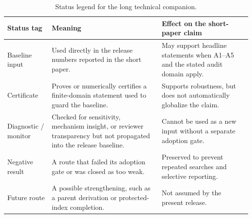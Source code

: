 \documentclass[aps,prd,onecolumn,notitlepage,nofootinbib,superscriptaddress,11pt,floatfix]{revtex4-2}
\begin{document}
\begin{table}[htbp]
\centering
\caption{Status legend for the long technical companion.}
\label{tab:supplement_status_legend}
\small
\setlength{\tabcolsep}{4pt}
\renewcommand{\arraystretch}{1.12}
\begin{tabular}{@{}l l l@{}}
\toprule
\parbox[t]{0.21\textwidth}{\textbf{Status tag}} & \parbox[t]{0.34\textwidth}{\textbf{Meaning}} & \parbox[t]{0.33\textwidth}{\textbf{Effect on the short-paper claim}} \\
\midrule
\parbox[t]{0.21\textwidth}{Baseline input} &
\parbox[t]{0.34\textwidth}{Used directly in the release numbers reported in the short paper.} &
\parbox[t]{0.33\textwidth}{May support headline statements when A1--A5 and the stated audit domain apply.} \\
\parbox[t]{0.21\textwidth}{Certificate} &
\parbox[t]{0.34\textwidth}{Proves or numerically certifies a finite-domain statement used to guard the baseline.} &
\parbox[t]{0.33\textwidth}{Supports robustness, but does not automatically globalize the claim.} \\
\parbox[t]{0.21\textwidth}{Diagnostic / monitor} &
\parbox[t]{0.34\textwidth}{Checked for sensitivity, mechanism insight, or reviewer transparency but not propagated into the release baseline.} &
\parbox[t]{0.33\textwidth}{Cannot be used as a new input without a separate adoption gate.} \\
\parbox[t]{0.21\textwidth}{Negative result} &
\parbox[t]{0.34\textwidth}{A route that failed its adoption gate or was closed as too weak.} &
\parbox[t]{0.33\textwidth}{Preserved to prevent repeated searches and selective reporting.} \\
\parbox[t]{0.21\textwidth}{Future route} &
\parbox[t]{0.34\textwidth}{A possible strengthening, such as a parent derivation or protected-index completion.} &
\parbox[t]{0.33\textwidth}{Not assumed by the present release.} \\
\bottomrule
\end{tabular}
\end{table}
\clearpage
\end{document}
